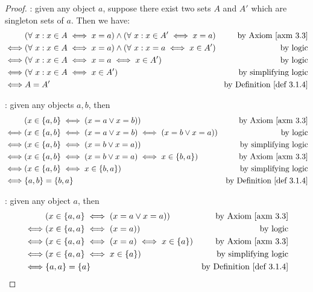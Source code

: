 \begin{proof}
: given any object \(a\), suppose there exist two sets \(A\) and \(A'\) which are singleton sets of \(a\). Then we have:
\begin{align*}
         & (\forall\ x : x \in A \iff x = a) \land (\forall\ x : x \in A' \iff x = a) & \text{by \AXM{3.3}} \\
    \iff & (\forall\ x : x \in A \iff x = a) \land (\forall\ x : x = a \iff x \in A') & \text{by logic} \\
    \iff & (\forall\ x : x \in A \iff x = a \iff x \in A')                            & \text{by logic} \\
    \iff & (\forall\ x : x \in A \iff x \in A')                                       & \text{by simplifying logic} \\
    \iff & A = A'                                                                     & \text{by \DEF{3.1.4}}
\end{align*}

: given any objects \(a, b\), then
\begin{align*}
    & (x \in \{a, b\} \iff (x = a \lor x = b)) & \text{by \AXM{3.3}} \\
    \iff & (x \in \{a, b\} \iff (x = a \lor x = b) \iff (x = b \lor x = a)) & \text{by logic} \\
    \iff & (x \in \{a, b\} \iff (x = b \lor x = a)) & \text{by simplifying logic} \\
    \iff & (x \in \{a, b\} \iff (x = b \lor x = a) \iff x \in \{b, a\}) & \text{by \AXM{3.3}} \\
    \iff & (x \in \{a, b\} \iff x \in \{b, a\}) & \text{by simplifying logic} \\
    \iff & \{a, b\} = \{b, a\} & \text{by \DEF{3.1.4}}
\end{align*}

: given any object \(a\), then
\begin{align*}
    & (x \in \{a, a\} \iff (x = a \lor x = a)) & \text{by \AXM{3.3}} \\
    \iff & (x \in \{a, a\} \iff (x = a)) & \text{by logic} \\
    \iff & (x \in \{a, a\} \iff (x = a) \iff x \in \{a\})& \text{by \AXM{3.3}} \\
    \iff & (x \in \{a, a\} \iff x \in \{a\})& \text{by simplifying logic} \\
    \iff & \{a, a\} = \{a\} & \text{by \DEF{3.1.4}}
\end{align*}
\end{proof}

